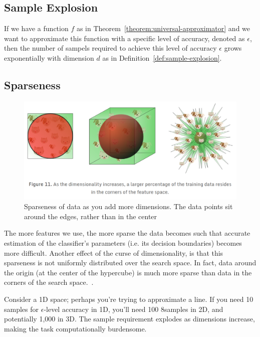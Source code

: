 \documentclass[11pt]{article}
\begin{document}
\subsection{Sample Explosion}

If we have a function $f$ as in Theorem~\ref{theorem:universal-approximator} and we want to approximate this function with a specific level of accuracy, denoted as $\epsilon$, then the number of sampels required to achieve this level of accuracy $\epsilon$ grows exponentially with dimension $d$ as in Definition~\ref{def:sample-explosion}.

\subsection{Sparseness}

\begin{figure}[H]
    \centering
    \includegraphics[width=.8\linewidth]{figures/edgeness-of-high-dimensions.png}
    \caption{Sparseness of data as you add more dimensions. The data points sit around the edges, rather than in the center~\cite{visiondummyCurseDimensionality}}\label{fig:edgeness-of-data}
\end{figure}

The more features we use, the more sparse the data becomes such that accurate estimation of the classifier’s parameters (i.e. its decision boundaries) becomes more difficult. Another effect of the curse of dimensionality, is that this sparseness is not uniformly distributed over the search space. In fact, data around the origin (at the center of the hypercube) is much more sparse than data in the corners of the search space.~\cite{visiondummyCurseDimensionality}.

Consider a 1D space; perhaps you're trying to approximate a line. If you need 10 samples for $\epsilon$-level accuracy in 1D, you'll need 100 8samples in 2D, and potentially 1,000 in 3D. The sample requirement explodes as dimensions increase, making the task computationally burdensome.
\end{document}
